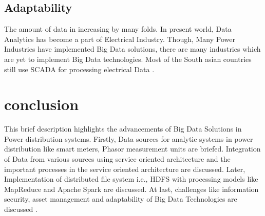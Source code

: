 \documentclass[sigconf]{acmart}
\begin{document}
\subsection{Adaptability}
The amount of data in increasing by many folds. In present world, Data Analytics has become a part of Electrical Industry. Though, Many Power Industries have implemented Big Data solutions, there are many industries which are yet to implement Big Data technologies. Most of the South asian countries still use SCADA for processing electrical Data \cite{2002}.
\section{conclusion}


This brief description highlights the advancements of Big Data Solutions in Power distribution systems. Firstly, Data sources for analytic systems in power distribution like smart meters, Phasor measurement units are briefed. Integration of Data from various sources using service oriented architecture and the important processes in the service oriented architecture are discussed. Later, Implementation of distributed file system i.e., HDFS with processing models like MapReduce and Apache Spark are discussed. At last, challenges like information security, asset management and adaptability of Big Data Technologies are discussed . 

 
\end{document}
